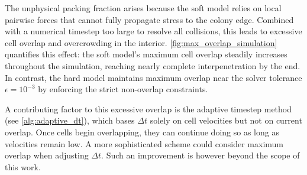 \documentclass[conference]{IEEEtran}
\begin{document}
The unphysical packing fraction arises because the soft model relies on local pairwise forces that cannot fully propagate stress to the colony edge. Combined with a numerical timestep too large to resolve all collisions, this leads to excessive cell overlap and overcrowding in the interior. \autoref{fig:max_overlap_simulation} quantifies this effect: the soft model's maximum cell overlap steadily increases throughout the simulation, reaching nearly complete interpenetration by the end. In contrast, the hard model maintains maximum overlap near the solver tolerance $\epsilon = 10^{-3}$ by enforcing the strict non-overlap constraints.

A contributing factor to this excessive overlap is the adaptive timestep method (see \autoref{alg:adaptive_dt}), which bases $\Delta t$ solely on cell velocities but not on current overlap. Once cells begin overlapping, they can continue doing so as long as velocities remain low. A more sophisticated scheme could consider maximum overlap when adjusting $\Delta t$. Such an improvement is however beyond the scope of this work.
\end{document}

